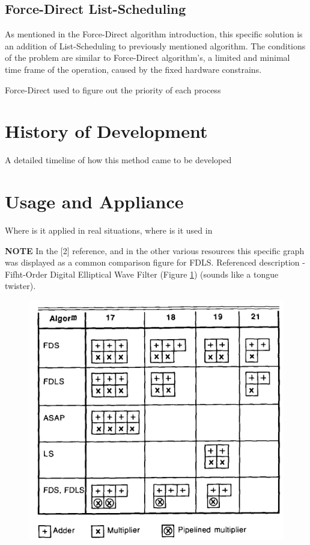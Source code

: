 \documentclass[conference]{IEEEtran}
\begin{document}
\subsection{Force-Direct List-Scheduling}
As mentioned in the Force-Direct algorithm introduction, this specific solution is an addition of List-Scheduling to previously mentioned algorithm. The conditions of the problem are similar to Force-Direct algorithm's, a limited and minimal time frame of the operation, caused by the fixed hardware constrains.

Force-Direct used to figure out the priority of each process 

\section{History of Development}
A detailed timeline of how this method came to be developed

\section{Usage and Appliance}
Where is it applied in real situations, where is it used in

\textbf{NOTE} In the [2] reference, and in the other various resources this specific graph was displayed as a common comparison figure for FDLS. Referenced description - Fifht-Order Digital Elliptical Wave Filter (Figure \ref{wavefilter}) (sounds like a tongue twister).

\begin{figure}[htbp]
\centerline{\includegraphics[scale=.5]{Result_Applience.png}}
\caption{}
\label{wavefilter}
\end{figure}
\end{document}
